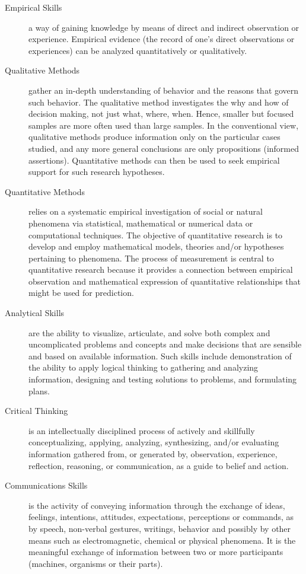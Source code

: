 \documentclass{tufte-book}\usepackage[]{graphicx}\usepackage[]{xcolor}
\begin{document}
\begin{description}
	\item [Empirical Skills] a way of gaining knowledge by means of direct and indirect observation or experience. Empirical evidence (the record of one's direct observations or experiences) can be analyzed quantitatively or qualitatively.

	\item [Qualitative Methods] gather an in-depth understanding of behavior and the reasons that govern such behavior. The qualitative method investigates the why and how of decision making, not just what, where, when. Hence, smaller but focused samples are more often used than large samples. In the conventional view, qualitative methods produce information only on the particular cases studied, and any more general conclusions are only propositions (informed assertions). Quantitative methods can then be used to seek empirical support for such research hypotheses.

	\item [Quantitative Methods] relies on a systematic empirical investigation of social or natural phenomena via statistical, mathematical or numerical data or computational techniques. The objective of quantitative research is to develop and employ mathematical models, theories and/or hypotheses pertaining to phenomena. The process of measurement is central to quantitative research because it provides a connection between empirical observation and mathematical expression of quantitative relationships that might be used for prediction.

	\item [Analytical Skills] are the ability to visualize, articulate, and solve both complex and uncomplicated problems and concepts and make decisions that are sensible and based on available information. Such skills include demonstration of the ability to apply logical thinking to gathering and analyzing information, designing and testing solutions to problems, and formulating plans.

	\item [Critical Thinking] is an intellectually disciplined process of actively and skillfully conceptualizing, applying, analyzing, synthesizing, and/or evaluating information gathered from, or generated by, observation, experience, reflection, reasoning, or communication, as a guide to belief and action.

	\item [Communications Skills] is the activity of conveying information through the exchange of ideas, feelings, intentions, attitudes, expectations, perceptions or commands, as by speech, non-verbal gestures, writings, behavior and possibly by other means such as electromagnetic, chemical or physical phenomena. It is the meaningful exchange of information between two or more participants (machines, organisms or their parts).

\end{description}
\end{document}

